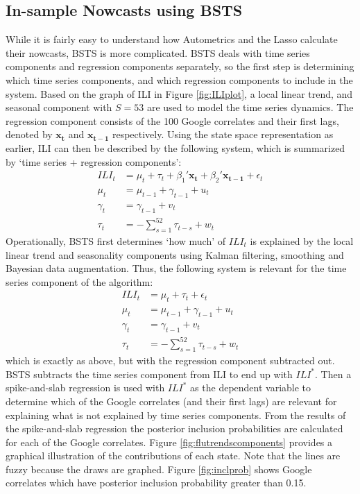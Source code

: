 \subsection{In-sample Nowcasts using BSTS}
While it is fairly easy to understand how Autometrics and the Lasso calculate their nowcasts, BSTS is more complicated. BSTS deals with time series components and regression components separately, so the first step is determining which time series components, and which regression components to include in the system. Based on the graph of ILI in Figure \ref{fig:ILIplot}, a local linear trend, and seasonal component with $S=53$ are used to model the time series dynamics. The regression component consists of the 100 Google correlates and their first lags, denoted by $\mathbf{x_{t}}$ and $\mathbf{x_{t-1}}$ respectively. Using the state space representation as earlier, ILI can then be described by the following system, which is summarized by `time series + regression components':
\begin{align*}
ILI_{t} &= \mu_{t} + \tau_{t} + \beta_{1}'\mathbf{x_{t}} +\beta_{2}'\mathbf{x_{t-1}} + \epsilon_{t}\\
\mu_{t} &= \mu_{t-1} + \gamma_{t-1} + u_{t}\\
\gamma_{t} &= \gamma_{t-1} + v_{t}\\
\tau_{t} &= - \sum_{s=1}^{52} \tau_{t-s} + w_{t}
\end{align*}
Operationally, BSTS first determines `how much' of $ILI_{t}$ is explained by the local linear trend and seasonality components using Kalman filtering, smoothing and Bayesian data augmentation. Thus, the following system is relevant for the time series component of the algorithm:
\begin{align*}
ILI_{t} &= \mu_{t} + \tau_{t} + \epsilon_{t}\\
\mu_{t} &= \mu_{t-1} + \gamma_{t-1} + u_{t}\\
\gamma_{t} &= \gamma_{t-1} + v_{t}\\
\tau_{t} &= - \sum_{s=1}^{52} \tau_{t-s} + w_{t}
\end{align*}
which is exactly as above, but with the regression component subtracted out. BSTS subtracts the time series component from ILI to end up with $ILI^*$. Then a spike-and-slab regression is used with $ILI^*$ as the dependent variable to determine which of the Google correlates (and their first lags) are relevant for explaining what is not explained by time series components. From the results of the spike-and-slab regression the posterior inclusion probabilities are calculated for each of the Google correlates. Figure \ref{fig:flutrendscomponents} provides a graphical illustration of the contributions of each state. Note that the lines are fuzzy because the draws are graphed. Figure \ref{fig:inclprob} shows Google correlates which have posterior inclusion probability greater than 0.15.

